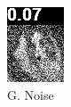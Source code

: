 \begin{figure}[H]
\begin{subfigure}[t]{0.15\textwidth}
    \includegraphics[width=\linewidth]{img/one-trial/loss_eval/L1/stimulus_1_noise_0.1_L1.png}
    \caption{G. Noise}
  \end{subfigure}
  \begin{subfigure}[t]{0.15\textwidth}
    \centering

\end{subfigure}
\end{figure}
